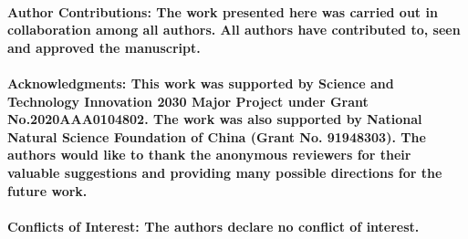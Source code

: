 \documentclass[journal,article,submit,pdftex,moreauthors]{Definitions/mdpi}
\begin{document}
\paragraph{\textbf{Author Contributions:} The work presented here was carried out in collaboration among all authors. All authors have contributed to, seen and approved the manuscript.}
\paragraph{\textbf{Acknowledgments:} This work was supported by Science and Technology Innovation 2030 Major Project under Grant No.2020AAA0104802. The work was also supported by National Natural Science Foundation of China (Grant No. 91948303). The authors would like to thank the anonymous reviewers for their valuable suggestions and providing many possible directions for the future work.}

\paragraph{\textbf{Conflicts of Interest:} The authors declare no conflict of interest.}

\vspace{6pt}
\end{document}
